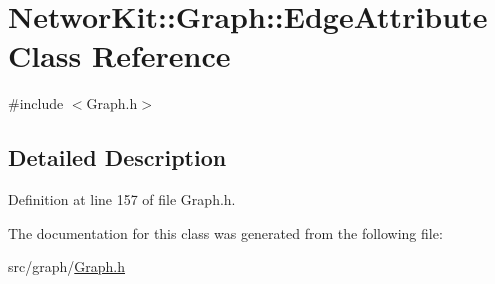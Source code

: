 \hypertarget{class_networ_kit_1_1_graph_1_1_edge_attribute}{\section{Networ\-Kit\-:\-:Graph\-:\-:Edge\-Attribute Class Reference}
\label{class_networ_kit_1_1_graph_1_1_edge_attribute}
}


{\ttfamily \#include $<$Graph.\-h$>$}



\subsection{Detailed Description}


Definition at line 157 of file Graph.\-h.



The documentation for this class was generated from the following file\-:\begin{DoxyCompactItemize}
\item 
src/graph/\hyperlink{_graph_8h}{Graph.\-h}\end{DoxyCompactItemize}
